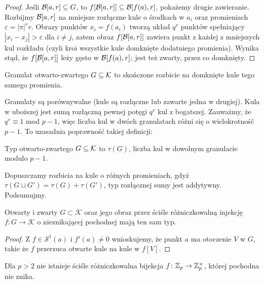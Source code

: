 \begin{proof}
	Jeśli $\mathcal B[a, r] \subseteq G$, to $f[\mathcal B[a, r]] \subseteq \mathcal B[f(a), r]$, pokażemy drugie zawieranie.
	Rozbijmy $\mathcal B[a, r]$ na mniejsze rozłączne kule o środkach w $a_i$ oraz promieniach $\varepsilon = |\pi|^v r$.
	Obrazy punktów $x_i = f(a_i)$ tworzą układ $q^v$ punktów spełniający $|x_i - x_j| > \varepsilon$ dla $i \neq j$, zatem obraz $f[\mathcal B[a, r]]$ zawiera punkt z każdej z mniejszych kul rozkładu (czyli kroi wszystkie kule domknięte dodatniego promienia).
	Wynika stąd, że $f[\mathcal B[a, r]]$ leży gęsto w $\mathcal B[f(a), r]$; jest też zwarty, przez co domknięty.
\end{proof}

\begin{definicja}
	Granulat otwarto-zwartego $G \subseteq \mathcal K$ to skończone rozbicie na domknięte kule tego samego promienia.
\end{definicja}

Granulaty są porównywalne (kule są rozłączne lub zawarte jedna w drugiej).
Kula w uboższej jest sumą rozłączną pewnej potęgi $q^v$ kul z bogatszej.
Zauważmy, że $q^v \equiv 1$ mod $p-1$, więc liczba kul w dwóch granulatach różni się o wielokrotność $p-1$.
To uzasadnia poprawność takiej definicji:

\begin{definicja}
	Typ otwarto-zwartego $G \subseteq \mathcal K$ to $\tau(G)$, liczba kul w dowolnym granulacie modulo $p-1$.
\end{definicja}

Dopuszczamy rozbicia na kule o różnych promieniach, gdyż $\tau(G \sqcup G') = \tau(G) + \tau(G')$, typ rozłącznej sumy jest addytywny.
Podsumujmy.

\begin{fakt}
	Otwarty i zwarty $G \subset \mathcal K$ oraz jego obraz przez ściśle różniczkowalną injekcję $f \colon G \to \mathcal K$ o nieznikającej pochodnej mają ten sam typ.
\end{fakt}

\begin{proof}
	Z $f \in \mathcal S^1(a)$ i $f'(a) \neq 0$ wnioskujemy, że punkt $a$ ma otoczenie $V$ w $G$, takie że $f$ przerzuca otwarte kule na kule w $f[V]$.
\end{proof}

\begin{wniosek}
	Dla $p > 2$ nie istnieje ściśle różniczkowalna bijekcja $f \colon \mathbb Z_p \to \mathbb Z_p^\times$, której pochodna nie znika.
\end{wniosek}

